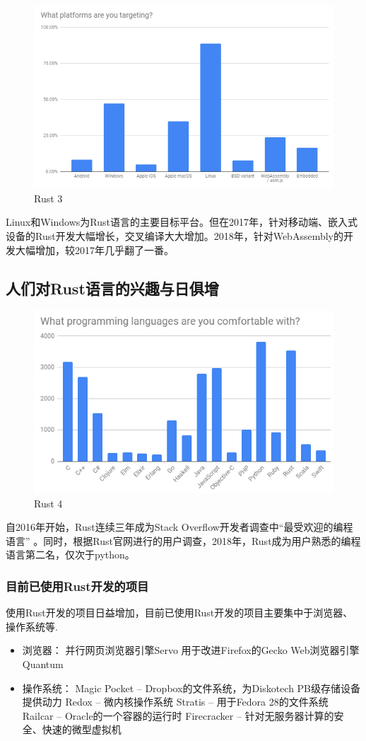 \documentclass[12pt, a4paper]{article}
\begin{document}
\begin{figure}[H]
	\centering
	\includegraphics[width=0.7\linewidth]{n3}
	\caption{Rust 3}
	\label{fig:n3}
\end{figure}
	Linux和Windows为Rust语言的主要目标平台。但在2017年，针对移动端、嵌入式设备的Rust开发大幅增长，交叉编译大大增加。2018年，针对WebAssembly的开发大幅增加，较2017年几乎翻了一番。
	
	\subsection{人们对Rust语言的兴趣与日俱增}
	
\begin{figure}[H]
	\centering
	\includegraphics[width=0.7\linewidth]{n4}
	\caption{Rust 4}
	\label{fig:n4}
\end{figure}
	自2016年开始，Rust连续三年成为Stack Overflow开发者调查中“最受欢迎的编程语言” 。同时，根据Rust官网进行的用户调查，2018年，Rust成为用户熟悉的编程语言第二名，仅次于python。
	
	\subsubsection{目前已使用Rust开发的项目}
	使用Rust开发的项目日益增加，目前已使用Rust开发的项目主要集中于浏览器、操作系统等.   
	\begin{itemize}
		\item 浏览器：
		\subitem 并行网页浏览器引擎Servo
		\subitem 用于改进Firefox的Gecko Web浏览器引擎Quantum 
		\item 操作系统：
		\subitem Magic Pocket –  Dropbox的文件系统，为Diskotech PB级存储设备提供动力      
		\subitem Redox – 微内核操作系统   
		\subitem Stratis – 用于Fedora 28的文件系统   
		\subitem Railcar – Oracle的一个容器的运行时    
		\subitem Firecracker – 针对无服务器计算的安全、快速的微型虚拟机   
	\end{itemize}
	
\end{document}
